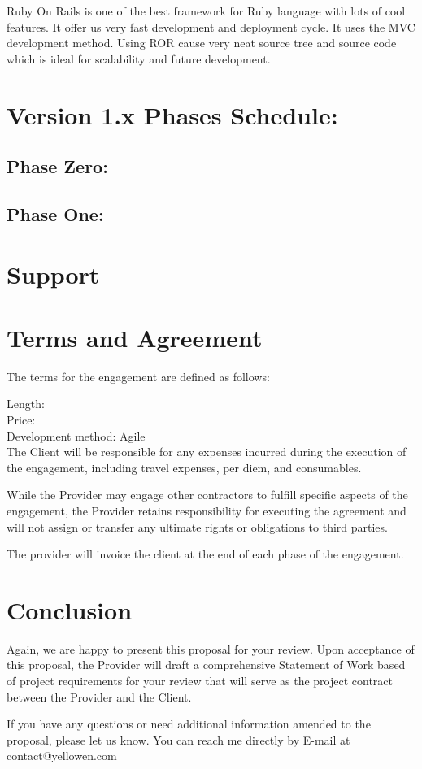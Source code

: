 \documentclass[a4paper,12pt]{article}
\begin{document}
Ruby On Rails is one of the best framework for Ruby language with lots of cool features.
It offer us very fast development and deployment cycle. It uses the MVC development method.
Using ROR cause very neat source tree and source code which is ideal for scalability and
future development.



\section*{Version 1.x Phases Schedule:}

\subsection*{\textbf{Phase Zero:} }
\subsection*{\textbf{Phase One:} }

\section*{Support}

\section*{Terms and Agreement}
The terms for the engagement are defined as follows:

Length:\\
Price:\\
Development method: Agile\\
The Client will be responsible for any expenses incurred during the execution of the
engagement, including travel expenses, per diem, and consumables.

While the Provider may engage other contractors to fulfill specific aspects of the
engagement, the Provider retains responsibility for executing the agreement and will
not assign or transfer any ultimate rights or obligations to third parties.

The provider will invoice the client at the end of each phase of the engagement.



\section*{Conclusion}
Again, we are happy to present this proposal for your review. Upon acceptance of this proposal,
the Provider will draft a comprehensive Statement of Work based of project requirements for your
review that will serve as the project contract between the Provider and the Client.

If you have any questions or need additional information amended to the proposal, please let us
know. You can reach me directly by E-mail at contact@yellowen.com
\end{document}
